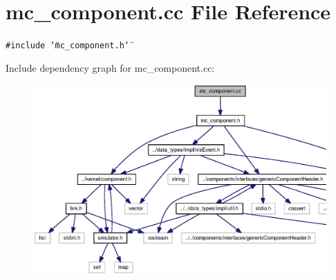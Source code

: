\section{mc\_\-component.cc File Reference}
\label{mc__component_8cc}
{\tt \#include \char`\"{}mc\_\-component.h\char`\"{}}\par


Include dependency graph for mc\_\-component.cc:\nopagebreak
\begin{figure}[H]
\begin{center}
\leavevmode
\includegraphics[width=413pt]{mc__component_8cc__incl}
\end{center}
\end{figure}
